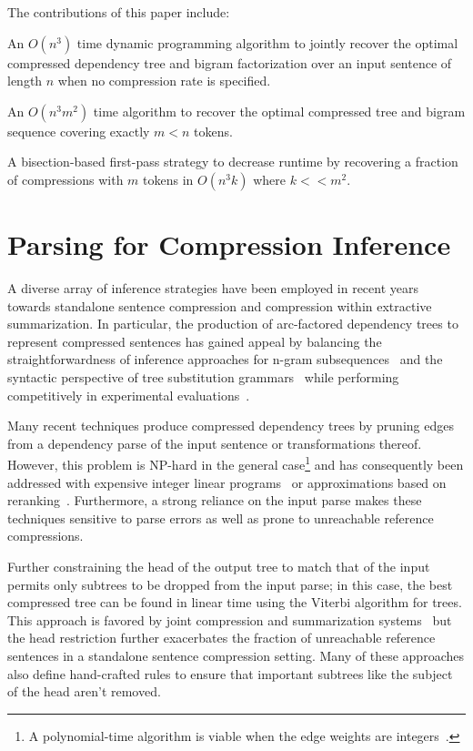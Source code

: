 \documentclass[11pt,a4paper]{article}
\newenvironment{packed_itemize}{
\begin{itemize}
  \setlength{\itemsep}{1pt}
  \setlength{\parskip}{0pt}
  \setlength{\parsep}{0pt}
}{\end{itemize}}
\begin{document}
The contributions of this paper include:
\begin{packed_itemize}
\item An $O(n^3)$ time dynamic programming algorithm to jointly recover the
    optimal compressed dependency tree and bigram factorization over an
    input sentence of length $n$ when no compression rate is specified.
\item An $O(n^3m^2)$ time algorithm to recover the optimal compressed
    tree and bigram sequence covering exactly $m < n$ tokens.
\item A bisection-based first-pass strategy to decrease runtime
    by recovering a fraction of compressions with $m$ tokens in
    $O(n^3k)$ where $k << m^2$.
\end{packed_itemize}

\section{Parsing for Compression Inference}
\label{parsing}

A diverse array of inference strategies have been employed in recent
years towards standalone sentence compression and compression within
extractive summarization. In particular, the production of
arc-factored dependency trees to represent compressed sentences
has gained appeal by balancing the straightforwardness
of inference approaches for n-gram subsequences~\cite{mcdonald06a,clarke08}
and the syntactic perspective of tree substitution
grammars~\cite{cohn09,woodsend12} while performing competitively in
experimental evaluations~\cite{galanis10,qian13,thadani14}.

Many recent techniques produce compressed dependency trees by
pruning edges from a dependency parse of the input
sentence or transformations thereof. However, this problem is NP-hard
in the general
case\footnote{A polynomial-time algorithm is viable when the edge weights
    are integers~\cite{lau06}.}
and has consequently been addressed with expensive integer linear
programs~\cite{filippova08a,filippova13} or approximations based on
reranking~\cite{nomoto09,galanis10}. Furthermore, a strong reliance
on the input parse makes these techniques sensitive to parse errors
as well as prone to unreachable reference compressions.

Further constraining the head of the output tree to match that of the
input permits only subtrees to be dropped from the input parse; in this case,
the best compressed tree can be found in linear time using the Viterbi
algorithm for trees. This approach is favored by joint compression
and summarization
systems~\cite{martins09a,gillick09,bergkirkpatrick11,almeida13,qian13}
but the head restriction further exacerbates the fraction of unreachable
reference sentences in a standalone sentence compression setting.
Many of these approaches also define hand-crafted rules
to ensure that important subtrees like the subject of the head aren't
removed.
\end{document}
